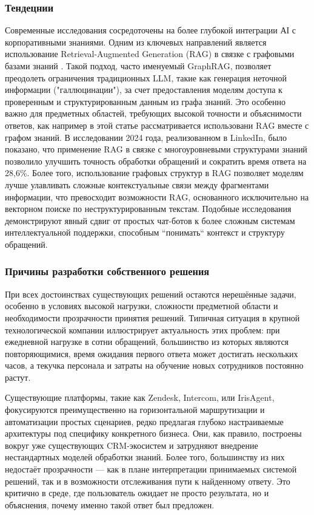 \subsubsection{Тендецнии}

Современные исследования сосредоточены на более глубокой интеграции АІ с корпоративными знаниями. Одним из ключевых направлений является использование Retrieval-Augmented Generation (RAG) в связке с графовыми базами знаний \cite{arxiv}. Такой подход, часто именуемый GraphRAG, позволяет преодолеть ограничения традиционных LLM, такие как генерация неточной информации ("галлюцинации"), за счет предоставления моделям доступа к проверенным и структурированным данным из графа знаний. Это особенно важно для предметных областей, требующих высокой точности и объяснимости ответов, как например в этой статье\cite{epsilonGRAG} рассматривается использовани RAG вместе с графом знаний. В исследовании 2024 года, реализованном в LinkedIn, было показано, что применение RAG в связке с многоуровневыми структурами знаний позволило улучшить точность обработки обращений и сократить время ответа на 28,6\%. Более того, использование графовых структур в RAG позволяет моделям лучше улавливать сложные контекстуальные связи между фрагментами информации, что превосходит возможности RAG, основанного исключительно на векторном поиске по неструктурированным текстам\cite{vectorBd}. Подобные исследования демонстрируют явный сдвиг от простых чат-ботов к более сложным системам интеллектуальной поддержки, способным ``понимать`` контекст и структуру обращений.

\subsubsection{Причины разработки собственного решения}

При всех достоинствах существующих решений остаются нерешённые задачи, особенно в условиях высокой нагрузки, сложности предметной области и необходимости прозрачности принятия решений. Типичная ситуация в крупной технологической компании иллюстрирует актуальность этих проблем: при ежедневной нагрузке в сотни обращений, большинство из которых являются повторяющимися, время ожидания первого ответа может достигать нескольких часов, а текучка персонала и затраты на обучение новых сотрудников постоянно растут.

Существующие платформы, такие как Zendesk, Intercom, или IrisAgent, фокусируются преимущественно на горизонтальной маршрутизации и автоматизации простых сценариев, редко предлагая глубоко настраиваемые архитектуры под специфику конкретного бизнеса. Они, как правило, построены вокруг уже существующих CRM-экосистем и затрудняют внедрение нестандартных моделей обработки знаний. Более того, большинству из них недостаёт прозрачности — как в плане интерпретации принимаемых системой решений, так и в возможности отслеживания пути к найденному ответу. Это критично в среде, где пользователь ожидает не просто результата, но и объяснения, почему именно такой ответ был предложен.

